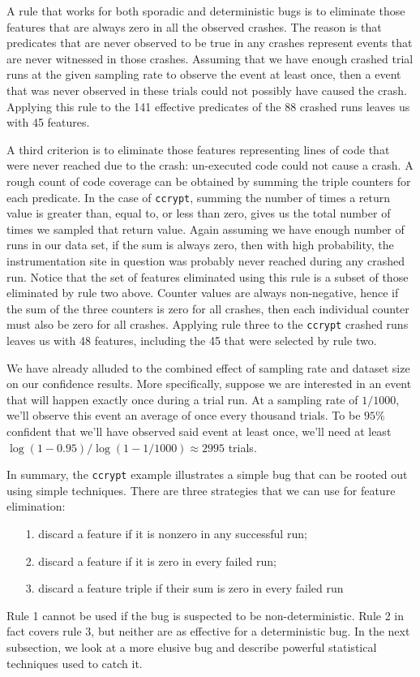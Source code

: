 A rule that works for both sporadic and deterministic bugs is to
eliminate those features that are always zero in all the observed
crashes.  The reason is that predicates that are never observed to be
true in any crashes represent events that are never witnessed in
those crashes.  Assuming that we have enough crashed trial runs at the
given sampling rate to observe the event at least once, then a event
that was never observed in these trials could not possibly have caused
the crash.  Applying this rule to the 141 effective predicates of the
88 crashed runs leaves us with 45 features.

A third criterion is to eliminate those features representing lines of
code that were never reached due to the crash: un-executed code could
not cause a crash.  A rough count of code coverage can be obtained by
summing the triple counters for each predicate.  In the case of
\texttt{ccrypt}, summing the number of times a return value is greater
than, equal to, or less than zero, gives us the total number of times
we sampled that return value.  Again assuming we have enough number of
runs in our data set, if the sum is always zero, then with high
probability, the instrumentation site in question was probably never
reached during any crashed run.  Notice that the set of features
eliminated using this rule is a subset of those eliminated by rule two
above.  Counter values are always non-negative, hence if the sum of
the three counters is zero for all crashes, then each individual
counter must also be zero for all crashes.  Applying rule three to the
\texttt{ccrypt} crashed runs leaves us with 48 features, including the
45 that were selected by rule two.

We have already alluded to the combined effect of sampling rate and
dataset size on our confidence results.  More specifically, suppose we
are interested in an event that will happen exactly once during a
trial run.  At a sampling rate of $1/1000$, we'll observe this event
an average of once every thousand trials.  To be $95\%$ confident that
we'll have observed said event at least once, we'll need at least
$\log(1-0.95)/ \log(1-1/1000) \approx 2995$ trials.

In summary, the \texttt{ccrypt} example illustrates a simple bug that
can be rooted out using simple techniques.  There are three strategies
that we can use for feature elimination:
\begin{enumerate}
\item[1.] discard a feature if it is nonzero in any successful run;
\item[2.] discard a feature if it is zero in every failed run;
\item[3.] discard a feature triple if their sum is zero in every failed run
\end{enumerate}
Rule 1 cannot be used if the bug is suspected to be
non-deterministic.  Rule 2 in fact covers rule 3, but neither are as
effective for a deterministic bug.  In the next subsection, we look at
a more elusive bug and describe powerful statistical techniques used
to catch it.

